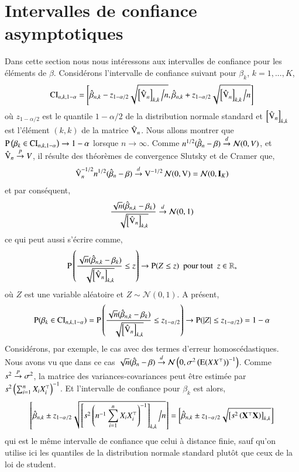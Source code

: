 \documentclass[10pt, reqno]{amsart}
\begin{document}
\section{Intervalles de confiance asymptotiques}
Dans cette section nous nous intéressons aux intervalles de confiance pour les éléments de $\beta$. Considérons l'intervalle de confiance suivant pour $\beta_k$, $k=1,...,K$,
\begin{align*}
\mathrm{CI}_{n, k, 1-\alpha} = \left[\hat{\beta}_{n, k} - z_{1-\alpha/2}\sqrt{\left[\hat{\operatorname{V}}_n\right]_{k,k} \Big{/} n}, 
\hat{\beta}_{n, k} + z_{1-\alpha/2}\sqrt{\left[\hat{\operatorname{V}}_n\right]_{k,k} \Big{/} n}\right]
\end{align*}
où $ z_{1-\alpha/2}$ est le quantile $1-\alpha/2$ de la distribution normale standard et $\left[\hat{\operatorname{V}}_n\right]_{k,k} $ est l'élément $(k, k)$ de la matrice $\hat{\operatorname{V}}_n$. Nous allons montrer que $\operatorname{P}\left(\beta_k \in \mathrm{CI}_{n, k, 1-\alpha} \right) \rightarrow 1 - \alpha$ lorsque $n\rightarrow \infty$. Comme $n^{1/2}(\hat{\beta}_n- \beta) \overset{d}{\rightarrow} \mathcal{N}(0, V)$, et $\hat{\operatorname{V}}_n \overset{p}{\rightarrow} V$, 
il résulte des théorèmes de convergence Slutsky et de Cramer que,
\begin{align*}
\hat{\operatorname{V}}_n^{-1/2} n^{1/2}(\hat{\beta}_n- \beta) \overset{d}{\rightarrow} \operatorname{V}^{-1/2}\mathcal{N}(0, \operatorname{V}) = \mathcal{N}(0, \mathbf{I}_K)
\end{align*}
et par conséquent,
\begin{align*}
\frac{\sqrt{n}(\hat{\beta}_{n, k} - \beta_k)}{\sqrt{\left[\hat{\operatorname{V}}_n\right]_{k,k} }} \overset{d}{\rightarrow} \mathcal{N}(0, 1)
\end{align*}
ce qui peut aussi s'écrire comme,
\begin{align*}
\operatorname{P}\left(\frac{\sqrt{n}(\hat{\beta}_{n,k} - \beta_k)}{\sqrt{\left[\hat{\operatorname{V}}_n\right]_{k,k} }} \leq z \right) \rightarrow \operatorname{P}(Z\leq z) \ \ \textrm{pour tout} \ \ z \in \mathbb{R},
\end{align*}
où $Z$ est une variable aléatoire et $Z \sim \mathcal{N}(0, 1)$. A présent,
\begin{align*}
\operatorname{P}(\beta_k \in \mathrm{CI}_{n, k, 1-\alpha} ) = \operatorname{P}\left(\frac{\sqrt{n}(\hat{\beta}_{n,k} - \beta_k)}{\sqrt{\left[\hat{\operatorname{V}}_n\right]_{k,k} }} \leq z_{1-\alpha/2} \right) \rightarrow \operatorname{P}(\left\vert {Z} \right\vert \leq z_{1-\alpha/2}  ) = 1 - \alpha
\end{align*}
Considérons, par exemple, le cas avec des termes d'erreur homoscédastiques.  Nous avons vu que dans ce cas $\sqrt{n}(\hat{\beta}_n- \beta) \overset{d}{\rightarrow} \mathcal{N}\left(0, \sigma^2\left(\operatorname{E}(XX^\top)\right)^{-1}\right)$. Comme $s^2 \overset{p}{\rightarrow} \sigma^2$, la matrice des variances-covariances peut être estimée par $s^2\left(\sum_{i=1}^n X_iX_i^\top\right)^{-1}$. Et l'intervalle de confiance pour $\beta_k$ est alors,
\begin{align*}
\left[\hat{\beta}_{n, k} \pm  z_{1 -  \alpha/2} \sqrt{ \left[s^2\left(n^{-1}\sum_{i=1}^n X_iX_i^\top\right)^{-1} \right]_{k,k} \Big{/} n}\right] = \left[\hat{\beta}_{n, k}  \pm z_{1-\alpha/2} \sqrt{\left[s^2\left(\mathbf{X}^\top\mathbf{X}\right)\right]_{k,k}}\right] 
\end{align*}
qui est le même intervalle de confiance que celui à distance finie, sauf qu'on utilise ici les quantiles de la distribution normale standard plutôt que ceux de la loi de student.
\end{document}
